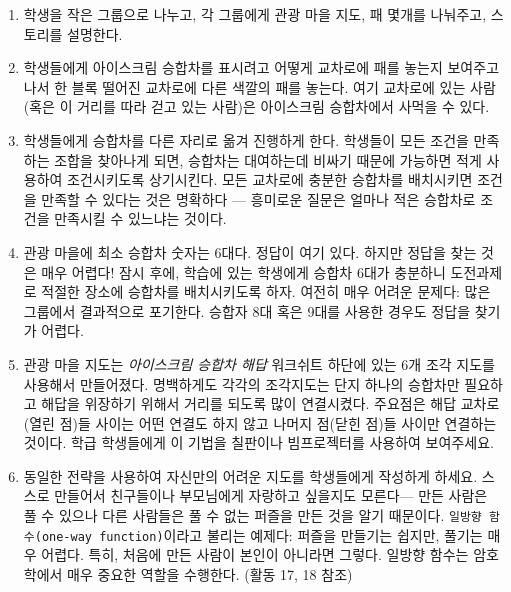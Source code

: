 \documentclass[]{article}
\begin{document}
\begin{enumerate}
\itemsep1pt\parskip0pt
\item
  학생을 작은 그룹으로 나누고, 각 그룹에게 관광 마을 지도, 패 몇개를
  나눠주고, 스토리를 설명한다.
\item
  학생들에게 아이스크림 승합차를 표시려고 어떻게 교차로에 패를 놓는지
  보여주고 나서 한 블록 떨어진 교차로에 다른 색깔의 패를 놓는다. 여기
  교차로에 있는 사람(혹은 이 거리를 따라 걷고 있는 사람)은 아이스크림
  승합차에서 사먹을 수 있다.
\item
  학생들에게 승합차를 다른 자리로 옮겨 진행하게 한다. 학생들이 모든
  조건을 만족하는 조합을 찾아나게 되면, 승합차는 대여하는데 비싸기
  때문에 가능하면 적게 사용하여 조건시키도록 상기시킨다. 모든 교차로에
  충분한 승합차를 배치시키면 조건을 만족할 수 있다는 것은 명확하다 ---
  흥미로운 질문은 얼마나 적은 승합차로 조건을 만족시킬 수 있느냐는
  것이다.
\item
  관광 마을에 최소 승합차 숫자는 6대다. 정답이 여기 있다. 하지만 정답을
  찾는 것은 매우 어렵다! 잠시 후에, 학습에 있는 학생에게 승합차 6대가
  충분하니 도전과제로 적절한 장소에 승합차를 배치시키도록 하자. 여전히
  매우 어려운 문제다: 많은 그룹에서 결과적으로 포기한다. 승합자 8대 혹은
  9대를 사용한 경우도 정답을 찾기가 어렵다.
\item
  관광 마을 지도는 \emph{아이스크림 승합차 해답} 워크쉬트 하단에 있는
  6개 조각 지도를 사용해서 만들어졌다. 명백하게도 각각의 조각지도는 단지
  하나의 승합차만 필요하고 해답을 위장하기 위해서 거리를 되도록 많이
  연결시켰다. 주요점은 해답 교차로(열린 점)들 사이는 어떤 연결도 하지
  않고 나머지 점(닫힌 점)들 사이만 연결하는 것이다. 학급 학생들에게 이
  기법을 칠판이나 빔프로젝터를 사용하여 보여주세요.
\item
  동일한 전략을 사용하여 자신만의 어려운 지도를 학생들에게 작성하게
  하세요. 스스로 만들어서 친구들이나 부모님에게 자랑하고 싶을지도
  모른다--- 만든 사람은 풀 수 있으나 다른 사람들은 풀 수 없는 퍼즐을
  만든 것을 알기 때문이다. \texttt{일방향 함수(one-way function)}이라고
  불리는 예제다: 퍼즐을 만들기는 쉽지만, 풀기는 매우 어렵다. 특히,
  처음에 만든 사람이 본인이 아니라면 그렇다. 일방향 함수는 암호학에서
  매우 중요한 역할을 수행한다. (활동 17, 18 참조)
\end{enumerate}
\end{document}
